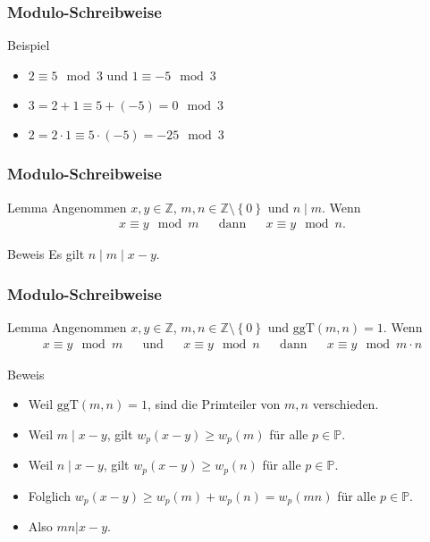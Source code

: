 \documentclass{beamer}
\newcommand\ZZ{\mathbb Z}
\newcommand\PP{\mathbb P}
\newcommand\cbc[1]{\left\{{#1}\right\}}
\newcommand{\ggt}{\mathrm{ggT}}
\newcommand{\ue}{\"u}
\begin{document}
\begin{frame}\frametitle{Modulo-Schreibweise}
	\begin{block}{Beispiel}
		\begin{itemize}
			\item $2\equiv 5\mod 3$ und $1\equiv -5\mod 3$
			\item $3=2+1\equiv 5+(-5)=0\mod 3$ 
			\item $2=2\cdot 1\equiv 5\cdot(-5)=-25\mod 3$ 
		\end{itemize}
	\end{block}
\end{frame}

\begin{frame}\frametitle{Modulo-Schreibweise}
	\begin{block}{Lemma}
		Angenommen $x,y\in\ZZ$, $m,n\in\ZZ\setminus\cbc 0$ und $n\mid m$.	
		Wenn
		\begin{align*}
			x\equiv y\mod m&&\mbox{dann}&&x\equiv y\mod n.
		\end{align*}
	\end{block}
	\begin{block}{Beweis}
		Es gilt	$n\mid m\mid x-y.$
	\end{block}
\end{frame}

\begin{frame}\frametitle{Modulo-Schreibweise}
	\begin{block}{Lemma}
		Angenommen $x,y\in\ZZ$, $m,n\in\ZZ\setminus\cbc 0$ und $\ggt(m,n)=1$.	
		Wenn
		\begin{align*}
			x\equiv y\mod m&&\mbox{und}&&x\equiv y\mod n&&\mbox{dann}&&x\equiv y\mod m\cdot n
		\end{align*}
	\end{block}
	\begin{block}{Beweis}
		\begin{itemize}
			\item Weil $\ggt(m,n)=1$, sind die Primteiler von $m,n$ verschieden.
			\item Weil $m\mid x-y$, gilt $w_p(x-y)\geq w_p(m)$ f\ue r alle $p\in\PP$.
			\item Weil $n\mid x-y$, gilt $w_p(x-y)\geq w_p(n)$ f\ue r alle $p\in\PP$.
			\item Folglich $w_p(x-y)\geq w_p(m)+w_p(n)=w_p(mn)$ f\ue r alle $p\in\PP$.
			\item Also $mn|x-y$.
		\end{itemize}
	\end{block}
\end{frame}
\end{document}
